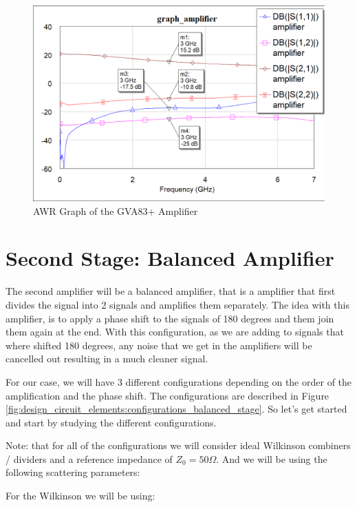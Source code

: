 \documentclass[12pt]{report} %
\begin{document}
\begin{figure}[htbp]
    \centering
    \includegraphics[width=\textwidth]{images/design_circuit_elements/graph_amplifier.png}
    \caption{AWR Graph of the GVA83+ Amplifier}
    \label{fig:design_circuit_elements:graph_amplifier}
\end{figure}

\section{Second Stage: Balanced Amplifier}

The second amplifier will be a balanced amplifier, that is a amplifier that first divides the signal into 2 signals and amplifies them separately. The idea with this amplifier, is to apply a phase shift to the signals of 180 degrees and them join them again at the end. With this configuration, as we are adding to signals that where shifted 180 degrees, any noise that we get in the amplifiers will be cancelled out resulting in a much cleaner signal.

For our case, we will have 3 different configurations depending on the order of the amplification and the phase shift. The configurations are described in Figure \ref{fig:design_circuit_elements:configurations_balanced_stage}. So let's get started and start by studying the different configurations.

Note: that for all of the configurations we will consider ideal Wilkinson combiners / dividers and a reference impedance of $Z_0 = 50 \Omega$. And we will be using the following scattering parameters:

For the Wilkinson we will be using: 
\end{document}
